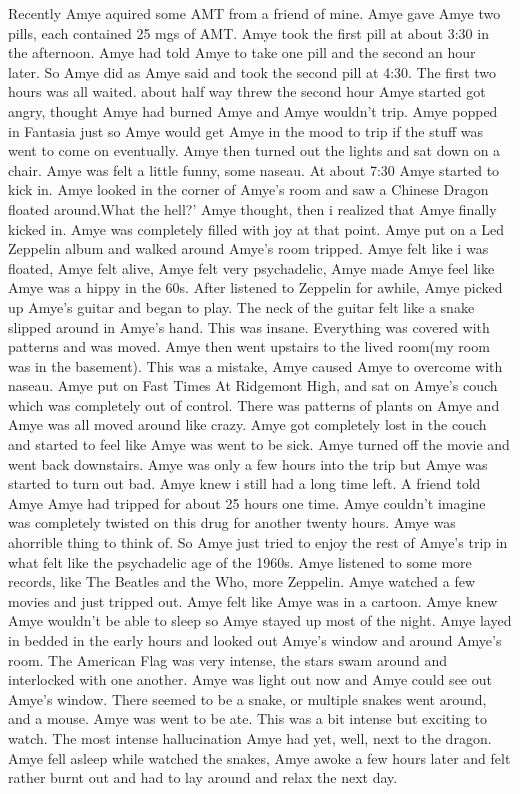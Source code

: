 \documentclass[12pt]{book}
\begin{document}
Recently Amye aquired some AMT from a friend of mine. Amye gave Amye two pills, each contained 25 mgs of AMT. Amye took the first pill at about 3:30 in the afternoon. Amye had told Amye to take one pill and the second an hour later. So Amye did as Amye said and took the second pill at 4:30. The first two hours was all waited. about half way threw the second hour Amye started got angry, thought Amye had burned Amye and Amye wouldn't trip. Amye popped in Fantasia just so Amye would get Amye in the mood to trip if the stuff was went to come on eventually. Amye then turned out the lights and sat down on a chair. Amye was felt a little funny, some naseau. At about 7:30 Amye started to kick in. Amye looked in the corner of Amye's room and saw a Chinese Dragon floated around.What the hell?' Amye thought, then i realized that Amye finally kicked in. Amye was completely filled with joy at that point. Amye put on a Led Zeppelin album and walked around Amye's room tripped. Amye felt like i was floated, Amye felt alive, Amye felt very psychadelic, Amye made Amye feel like Amye was a hippy in the 60s. After listened to Zeppelin for awhile, Amye picked up Amye's guitar and began to play. The neck of the guitar felt like a snake slipped around in Amye's hand. This was insane. Everything was covered with patterns and was moved. Amye then went upstairs to the lived room(my room was in the basement). This was a mistake, Amye caused Amye to overcome with naseau. Amye put on Fast Times At Ridgemont High, and sat on Amye's couch which was completely out of control. There was patterns of plants on Amye and Amye was all moved around like crazy. Amye got completely lost in the couch and started to feel like Amye was went to be sick. Amye turned off the movie and went back downstairs. Amye was only a few hours into the trip but Amye was started to turn out bad. Amye knew i still had a long time left. A friend told Amye Amye had tripped for about 25 hours one time. Amye couldn't imagine was completely twisted on this drug for another twenty hours. Amye was ahorrible thing to think of. So Amye just tried to enjoy the rest of Amye's trip in what felt like the psychadelic age of the 1960s. Amye listened to some more records, like The Beatles and the Who, more Zeppelin. Amye watched a few movies and just tripped out. Amye felt like Amye was in a cartoon. Amye knew Amye wouldn't be able to sleep so Amye stayed up most of the night. Amye layed in bedded in the early hours and looked out Amye's window and around Amye's room. The American Flag was very intense, the stars swam around and interlocked with one another. Amye was light out now and Amye could see out Amye's window. There seemed to be a snake, or multiple snakes went around, and a mouse. Amye was went to be ate. This was a bit intense but exciting to watch. The most intense hallucination Amye had yet, well, next to the dragon. Amye fell asleep while watched the snakes, Amye awoke a few hours later and felt rather burnt out and had to lay around and relax the next day.
\end{document}
